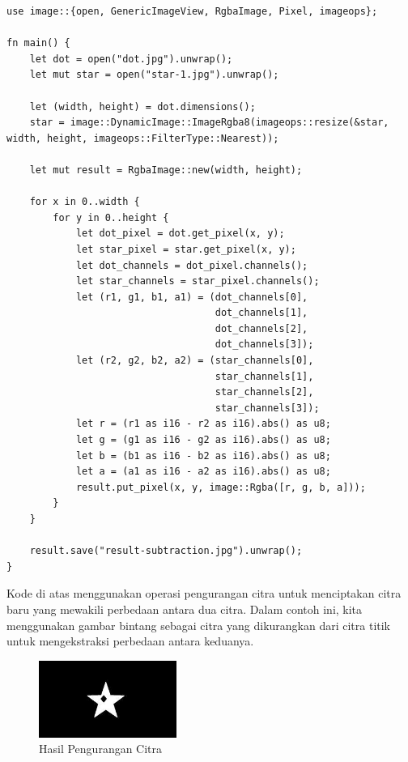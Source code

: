 \documentclass[a4paper,12pt,openany]{book}
\begin{document}
\begin{lstlisting}
use image::{open, GenericImageView, RgbaImage, Pixel, imageops};

fn main() {
    let dot = open("dot.jpg").unwrap();
    let mut star = open("star-1.jpg").unwrap();

    let (width, height) = dot.dimensions();
    star = image::DynamicImage::ImageRgba8(imageops::resize(&star, width, height, imageops::FilterType::Nearest));

    let mut result = RgbaImage::new(width, height);

    for x in 0..width {
        for y in 0..height {
            let dot_pixel = dot.get_pixel(x, y);
            let star_pixel = star.get_pixel(x, y);
            let dot_channels = dot_pixel.channels();
            let star_channels = star_pixel.channels();
            let (r1, g1, b1, a1) = (dot_channels[0],
                                    dot_channels[1],
                                    dot_channels[2],
                                    dot_channels[3]);
            let (r2, g2, b2, a2) = (star_channels[0],
                                    star_channels[1],
                                    star_channels[2],
                                    star_channels[3]);
            let r = (r1 as i16 - r2 as i16).abs() as u8;
            let g = (g1 as i16 - g2 as i16).abs() as u8;
            let b = (b1 as i16 - b2 as i16).abs() as u8;
            let a = (a1 as i16 - a2 as i16).abs() as u8;
            result.put_pixel(x, y, image::Rgba([r, g, b, a]));
        }
    }

    result.save("result-subtraction.jpg").unwrap();
}
\end{lstlisting}

Kode di atas menggunakan operasi pengurangan citra untuk menciptakan citra baru yang mewakili perbedaan antara dua citra. Dalam contoh ini, kita menggunakan gambar bintang sebagai citra yang dikurangkan dari citra titik untuk mengekstraksi perbedaan antara keduanya.

\begin{figure}[H]
    \centering
    \includegraphics[width=0.4\textwidth]{./image/arithmetic/result-subtraction.jpg}
    \caption{Hasil Pengurangan Citra}
\end{figure}
\end{document}
